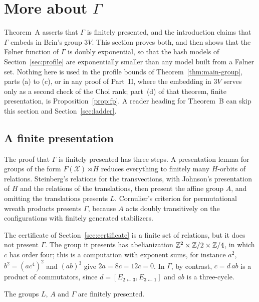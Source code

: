 \section{More about \texorpdfstring{$\Gamma$}{Gamma}}\label{sec:more}

Theorem~A asserts that $\Gamma$ is finitely presented, and the introduction claims that $\Gamma$ embeds in Brin's group $3V$. This section
proves both, and then shows that the F\o lner function of $\Gamma$ is doubly exponential, so that the hash models of Section~\ref{sec:profile}
are exponentially smaller than any model built from a F\o lner set. Nothing here is used in the profile bounds of
Theorem~\ref{thm:main-group}, parts (a) to (c), or in any proof of Part~II, where the embedding in $3V$ serves only as a second
check of the Choi rank; part~(d) of that theorem, finite presentation, is
Proposition~\ref{prop:fp}. A reader heading for Theorem~B can skip this section and Section~\ref{sec:ladder}.

\subsection{A finite presentation}\label{sec:fp}

The proof that $\Gamma$ is finitely presented has three steps. A presentation lemma for groups of the form $F(\mathcal X)\rtimes H$ reduces
everything to finitely many $H$-orbits of relations. Steinberg's relations for the transvections, with Johnson's presentation of $H$ and the
relations of the translations, then present the affine group $A$, and omitting the translations presents $L$. Cornulier's criterion for
permutational wreath products presents $\Gamma$, because $A$ acts doubly transitively on the configurations with finitely generated
stabilizers.

The certificate of Section~\ref{sec:certificate} is a finite set of relations, but it does not present $\Gamma$. The group it presents has
abelianization $\mathbb Z^2\times\mathbb Z/2\times\mathbb Z/4$, in which $c$ has order four; this is a computation with exponent sums, for instance $a^2$, $b^2=(ac^4)^2$
and $(ab)^3$ give $2a=8c=12c=0$. In $\Gamma$, by contrast, $c=d\,ab$ is a product of commutators, since $d=[E_{2\leftarrow3},E_{3\leftarrow1}]$
and $ab$ is a three-cycle.

\begin{proposition}\label{prop:fp}
The groups $L$, $A$ and $\Gamma$ are finitely presented.
\end{proposition}

